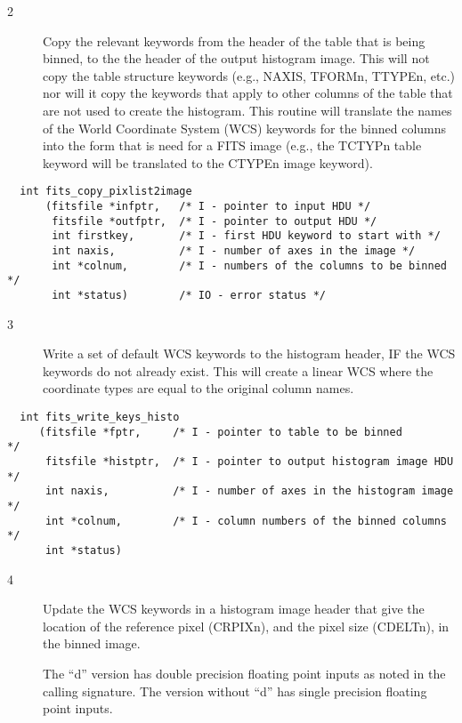 \documentclass[11pt]{book}
\begin{document}
\begin{description}
\item[2 ] Copy the relevant keywords from the header of the table that is being
binned, to the the header of the output histogram image.  This will not
copy the table structure keywords (e.g., NAXIS, TFORMn, TTYPEn, etc.) nor
will it copy the keywords that apply to other columns of the table that are
not used to create the histogram.  This routine will translate the names of
the World Coordinate System (WCS) keywords for the binned columns into the
form that is need for a FITS image (e.g., the TCTYPn table keyword will
be translated to the CTYPEn image keyword).
 \label{copypixlist2image}
\end{description}

\begin{verbatim}
  int fits_copy_pixlist2image
      (fitsfile *infptr,   /* I - pointer to input HDU */
       fitsfile *outfptr,  /* I - pointer to output HDU */
       int firstkey,       /* I - first HDU keyword to start with */
       int naxis,          /* I - number of axes in the image */
       int *colnum,        /* I - numbers of the columns to be binned  */
       int *status)        /* IO - error status */
\end{verbatim}


\begin{description}
\item[3 ] Write a set of default WCS keywords to the histogram header, IF the
WCS keywords do not already exist.  This will create a linear WCS where
the coordinate types are equal to the original column names.
 \label{writekeyshisto}
\end{description}

\begin{verbatim}
  int fits_write_keys_histo
     (fitsfile *fptr,     /* I - pointer to table to be binned              */
      fitsfile *histptr,  /* I - pointer to output histogram image HDU      */
      int naxis,          /* I - number of axes in the histogram image      */
      int *colnum,        /* I - column numbers of the binned columns       */
      int *status)
\end{verbatim}


\begin{description}
\item[4 ] Update the WCS keywords in a histogram image header that give the location
of the reference pixel (CRPIXn), and the pixel size (CDELTn), in the binned
image.

The ``d'' version has double precision floating point inputs as noted
in the calling signature.  The version without ``d'' has single
precision floating point inputs.

 \label{rebinwcs}
\end{description}
\end{document}
